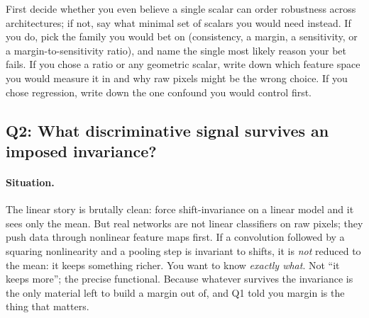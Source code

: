 \begin{problem}
First decide whether you even believe a single scalar can order robustness across architectures; if
not, say what minimal set of scalars you would need instead. If you do, pick the family you would bet
on (consistency, a margin, a sensitivity, or a margin-to-sensitivity ratio), and name the single
most likely reason your bet fails. If you chose a ratio or any geometric scalar, write down which
feature space you would measure it in and why raw pixels might be the wrong choice. If you chose
regression, write down the one confound you would control first.
\end{problem}

\subsection{Q2: What discriminative signal survives an imposed invariance?}
\label{sub:p2-q2}

\paragraph{Situation.} The linear story is brutally clean: force shift-invariance on a linear model
and it sees only the mean. But real networks are not linear classifiers on raw pixels; they push
data through nonlinear feature maps first. If a convolution followed by a squaring nonlinearity and
a pooling step is invariant to shifts, it is \emph{not} reduced to the mean: it keeps something
richer. You want to know \emph{exactly what}. Not ``it keeps more''; the precise functional. Because
whatever survives the invariance is the only material left to build a margin out of, and Q1 told you
margin is the thing that matters.

